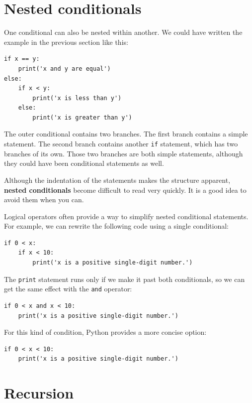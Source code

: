 \documentclass[10pt]{book}
\begin{document}
\section{Nested conditionals}

One conditional can also be nested within another.  We could have
written the example in the previous section like this:

\begin{verbatim}
if x == y:
    print('x and y are equal')
else:
    if x < y:
        print('x is less than y')
    else:
        print('x is greater than y')
\end{verbatim}
%
The outer conditional contains two branches.  The
first branch contains a simple statement.  The second branch
contains another {\tt if} statement, which has two branches of its
own.  Those two branches are both simple statements,
although they could have been conditional statements as well.

Although the indentation of the statements makes the structure
apparent, {\bf nested conditionals} become difficult to read very
quickly.  It is a good idea to avoid them when you can.

Logical operators often provide a way to simplify nested conditional
statements.  For example, we can rewrite the following code using a
single conditional:

\begin{verbatim}
if 0 < x:
    if x < 10:
        print('x is a positive single-digit number.')
\end{verbatim}
%
The {\tt print} statement runs only if we make it past both
conditionals, so we can get the same effect with the {\tt and} operator:

\begin{verbatim}
if 0 < x and x < 10:
    print('x is a positive single-digit number.')
\end{verbatim}

For this kind of condition, Python provides a more concise option:

\begin{verbatim}
if 0 < x < 10:
    print('x is a positive single-digit number.')
\end{verbatim}


\section{Recursion}
\label{recursion}
\end{document}
